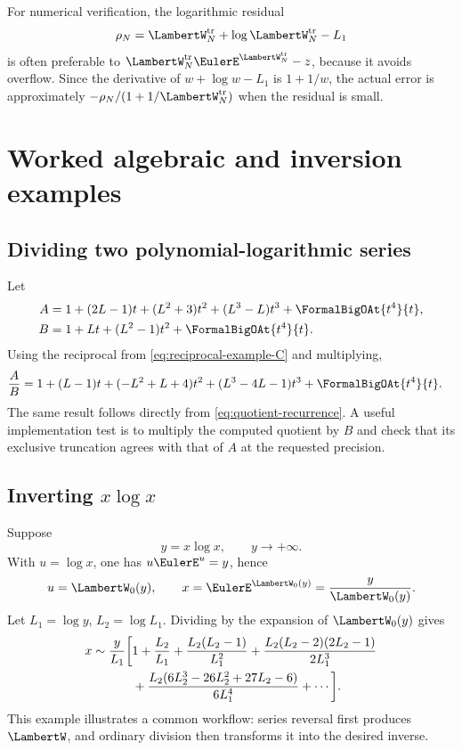\documentclass[11pt]{article}
\theoremstyle{pltheorem}
\newcommand{\LambertWTruncation}[1]{\LambertW^{\mathrm{tr}}_{#1}}
\begin{document}
For numerical verification, the logarithmic residual
\begin{equation}\label{eq:W-log-residual}
 \rho_N=\LambertWTruncation{N}+\log \LambertWTruncation{N}-L_1
\end{equation}
is often preferable to \(\LambertWTruncation{N}\EulerE^{\LambertWTruncation{N}}-z\), because it avoids overflow.  Since the derivative of \(w+\log w-L_1\) is \(1+1/w\), the actual error is approximately
\(-\rho_N/(1+1/\LambertWTruncation{N})\) when the residual is small.

\section{Worked algebraic and inversion examples}
\label{sec:worked-examples}

\subsection{Dividing two polynomial-logarithmic series}

Let
\begin{align*}
 A&=1+(2L-1)t+(L^2+3)t^2+(L^3-L)t^3+\FormalBigOAt{t^4}{t},\\
 B&=1+Lt+(L^2-1)t^2+\FormalBigOAt{t^4}{t}.
\end{align*}
Using the reciprocal from \cref{eq:reciprocal-example-C} and multiplying,
\begin{align}
 \frac AB={}&1+(L-1)t+(-L^2+L+4)t^2
 +(L^3-4L-1)t^3+\FormalBigOAt{t^4}{t}.
 \label{eq:worked-quotient}
\end{align}
The same result follows directly from \cref{eq:quotient-recurrence}.  A useful implementation test is to multiply the computed quotient by \(B\) and check that its exclusive truncation agrees with that of \(A\) at the requested precision.

\subsection{\texorpdfstring{Inverting \(x\log x\)}{Inverting x log x}}

Suppose
\begin{equation}\label{eq:xlogx-equation}
 y=x\log x,
 \qquad y\to+\infty.
\end{equation}
With \(u=\log x\), one has \(u\EulerE^u=y\), hence
\begin{equation}\label{eq:xlogx-exact}
 u=\LambertW_0(y),
 \qquad
 x=\EulerE^{\LambertW_0(y)}=\frac{y}{\LambertW_0(y)}.
\end{equation}
Let \(L_1=\log y\), \(L_2=\log L_1\).  Dividing by the expansion of \(\LambertW_0(y)\) gives
\begin{align}
 x\sim\frac{y}{L_1}\bigg[{}&1+\frac{L_2}{L_1}
 +\frac{L_2(L_2-1)}{L_1^2}
 +\frac{L_2(L_2-2)(2L_2-1)}{2L_1^3}
 \notag\\
 &+\frac{L_2(6L_2^3-26L_2^2+27L_2-6)}{6L_1^4}
 +\cdots\bigg].
 \label{eq:xlogx-inverse-expansion}
\end{align}
This example illustrates a common workflow: series reversal first produces \(\LambertW\), and ordinary division then transforms it into the desired inverse.
\end{document}

